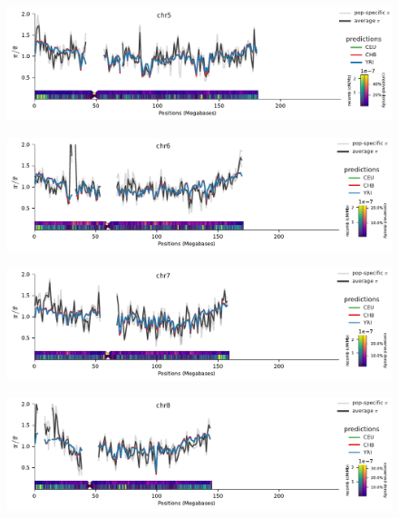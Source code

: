 \documentclass[11pt]{article}
\begin{document}
\begin{figure}[!htb]
  \centering
  \includegraphics[width=\textwidth]{figures/supplementary/pred_plot_chr5.pdf}
  \label{suppfig:fit-chr5}
\end{figure}


\begin{figure}[!htb]
  \centering
  \includegraphics[width=\textwidth]{figures/supplementary/pred_plot_chr6.pdf}
  \label{suppfig:fit-chr6}
\end{figure}


\begin{figure}[!htb]
  \centering
  \includegraphics[width=\textwidth]{figures/supplementary/pred_plot_chr7.pdf}
  \label{suppfig:fit-chr7}
\end{figure}


\begin{figure}[!htb]
  \centering
  \includegraphics[width=\textwidth]{figures/supplementary/pred_plot_chr8.pdf}
  \label{suppfig:fit-chr8}
\end{figure}
\end{document}
